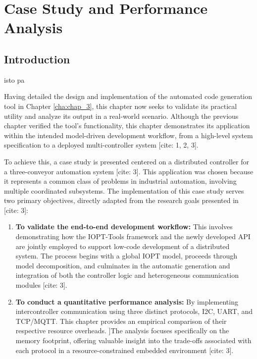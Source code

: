 
%


\chapter{Case Study and Performance Analysis}
\label{cha:case_study}


%

\section{Introduction}
\label{sec:case_study_intro}
isto pa \cite{tavaresgomes2026}


Having detailed the design and implementation of the automated code generation tool in Chapter \ref{cha:chap_3}, this chapter now seeks to validate its practical utility and analyze its output in a real-world scenario. Although the previous chapter verified the tool's functionality, this chapter demonstrates its application within the intended model-driven development workflow, from a high-level system specification to a deployed multi-controller system [cite: 1, 2, 3].

To achieve this, a case study is presented centered on a distributed controller for a three-conveyor automation system [cite: 3]. This application was chosen because it represents a common class of problems in industrial automation, involving multiple coordinated subsystems. The implementation of this case study serves two primary objectives, directly adapted from the research goals presented in [cite: 3]:

\begin{enumerate}
    \item \textbf{To validate the end-to-end development workflow:} This involves demonstrating how the IOPT-Tools framework and the newly developed API are jointly employed to support low-code development of a distributed system. The process begins with a global IOPT model, proceeds through model decomposition, and culminates in the automatic generation and integration of both the controller logic and heterogeneous communication modules [cite: 3].
    
    \item \textbf{To conduct a quantitative performance analysis:} By implementing intercontroller communication using three distinct protocols, I2C, UART, and TCP/MQTT. This chapter provides an empirical comparison of their respective resource overheads. ]The analysis focuses specifically on the memory footprint, offering valuable insight into the trade-offs associated with each protocol in a resource-constrained embedded environment [cite: 3].
\end{enumerate}


